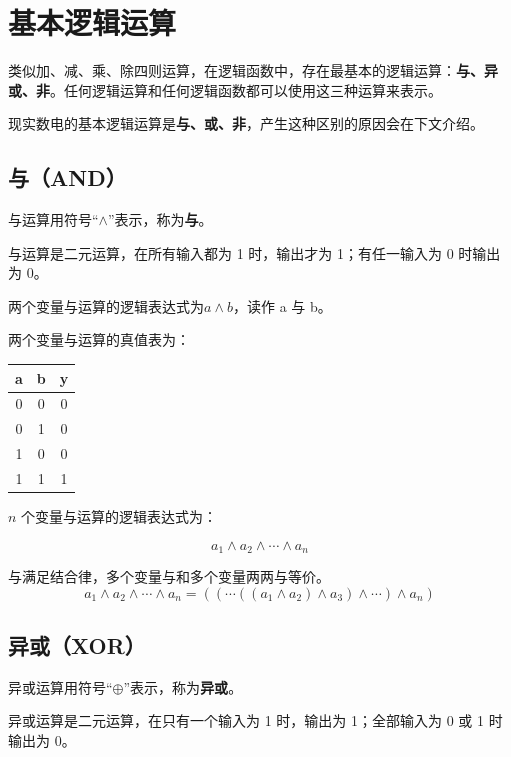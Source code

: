 \section{基本逻辑运算}

类似加、减、乘、除四则运算，在逻辑函数中，存在最基本的逻辑运算：\textbf{与、异或、非}。任何逻辑运算和任何逻辑函数都可以使用这三种运算来表示。

\begin{note}{}{}
  现实数电的基本逻辑运算是\textbf{与、或、非}，产生这种区别的原因会在下文介绍。
\end{note}

\subsection{与（AND）}

与运算用符号“$\land$”表示，称为\textbf{与}。

与运算是二元运算，在所有输入都为 1 时，输出才为 1；有任一输入为 0 时输出为 0。

两个变量与运算的逻辑表达式为$a \land b$，读作 a 与 b。

两个变量与运算的真值表为：

\begin{longtable}{|c|c|c|}
\hline
\textbf{a} & \textbf{b} & \textbf{y} \\ \hline
\endhead
0 & 0 & 0 \\ \hline
0 & 1 & 0 \\ \hline
1 & 0 & 0 \\ \hline
1 & 1 & 1 \\ \hline
\end{longtable}

$n$ 个变量与运算的逻辑表达式为：

$$a_1 \land a_2 \land \cdots \land a_n$$

\begin{remark}{}{}
  与满足结合律，多个变量与和多个变量两两与等价。
  $$a_1 \land a_2 \land \cdots \land a_n = (( \cdots ((a_1 \land a_2) \land a_3) \land \cdots) \land a_n)$$
\end{remark}

\subsection{异或（XOR）}

异或运算用符号“$\oplus$”表示，称为\textbf{异或}。

异或运算是二元运算，在只有一个输入为 1 时，输出为 1；全部输入为 0 或 1 时输出为 0。


